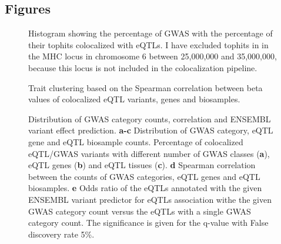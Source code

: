 \begin{backmatter}

    \section*{Figures}

%
%

    \begin{figure}[!ht]
        \caption{Histogram showing the percentage of GWAS with the percentage of their tophits colocalized with eQTLs.
        I have excluded tophits in in the MHC locus in chromosome 6 between 25,000,000 and 35,000,000,
            because this locus is not included in the colocalization pipeline.}
        \label{fig:1}
    \end{figure}

%
%

    \begin{figure}[!ht]
        \caption{Trait clustering based on the Spearman correlation between beta values of colocalized eQTL variants, genes and biosamples.}
        \label{fig:2}
    \end{figure}

%
%
%
    \begin{figure}[!ht]
        \caption{Distribution of GWAS category counts, correlation and ENSEMBL variant effect prediction.
        \textbf{a-c} Distribution of GWAS category, eQTL gene and eQTL biosample counts.
        Percentage of colocalized eQTL/GWAS variants with different number of GWAS classes (\textbf{a}), eQTL genes (\textbf{b}) and eQTL tissues (\textbf{c}).
        \textbf{d} Spearman correlation between the counts of GWAS categories, eQTL genes and eQTL biosamples.
        \textbf{e} Odds ratio of the eQTLs annotated with the given ENSEMBL variant predictor
        for eQTLs association withe the given GWAS category count versus the eQTLs with a single GWAS category count.
        The significance is given for the q-value with False discovery rate 5\%.
        }
        \label{fig:3}
    \end{figure}


\end{backmatter}
